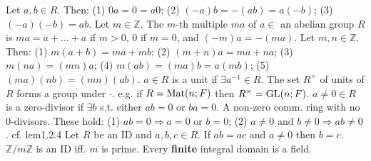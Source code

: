  Let $a, b \in R$. Then:
(1) $0a = 0 = a0$;
(2) $(-a)b = -(ab) = a(-b)$;
(3) $(-a)(-b) = ab$.
 Let $m \in \mathbb{Z}$. The $m$-th multiple $ma$ of $a \in$ an abelian group $R$ is $ma = a + \dots + a$ if $m > 0$, $0$ if $m=0$, and $(-m)a=-(ma)$.
 Let $m, n \in \mathbb{Z}$. Then:
(1) $m(a + b) = ma + mb$;
(2) $(m + n)a = ma + na$;
(3) $m(na) = (mn)a$;
(4) $m(ab) = (ma)b = a(mb)$;
(5) $(ma)(nb) = (mn)(ab)$.
 $a \in R$ is a unit if $\exists a^{-1} \in R$.
 The set $R^{\times}$ of units of $R$ forms a group under $\cdot$. e.g. if $R= \text{Mat}(n; F)$ then $R^{\times} = \text{GL}(n; F)$.
 $a \ne 0 \in R$ is a zero-divisor if $\exists b$ s.t. either $ab=0$ or $ba=0$.
 A non-zero comm. ring with no 0-divisors. These hold:
(1) $ab=0 \Rightarrow a = 0 \text{ or } b = 0$;
(2) $a \ne 0 \text{ and } b \ne 0 \Rightarrow ab \ne 0$. cf. lem1.2.4
 Let $R$ be an ID and $a, b, c \in R$. If $ab = ac$ and $a \ne 0$ then $b = c$.
 $\mathbb{Z}/m\mathbb{Z}$ is an ID iff. $m$ is prime.
 Every \textbf{finite} integral domain is a field.
